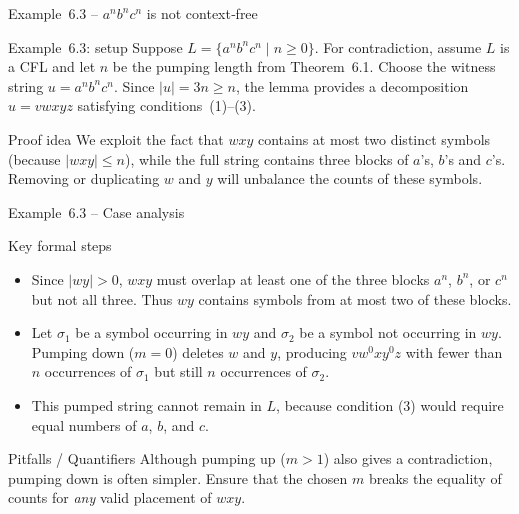 \begin{frame}[t]{Example 6.3 – $a^n b^n c^n$ is not context‑free}
  \begin{texample}{Example 6.3: setup}
    Suppose $L = \{ a^n b^n c^n \mid n \ge 0 \}$.  For contradiction,
    assume $L$ is a CFL and let $n$ be the pumping length from
    Theorem 6.1.  Choose the witness string $u = a^n b^n c^n$.  Since
    $|u| = 3n \ge n$, the lemma provides a decomposition $u = v w x y z$
    satisfying conditions (1)–(3).
  \end{texample}
  \begin{tblock}{Proof idea}
    We exploit the fact that $w x y$ contains at most two distinct
    symbols (because $|w x y| \le n$), while the full string contains
    three blocks of $a$’s, $b$’s and $c$’s.  Removing or duplicating
    $w$ and $y$ will unbalance the counts of these symbols.
  \end{tblock}
  \label{fr:6.1-11}
\end{frame}

\begin{frame}[t]{Example 6.3 – Case analysis}
  \begin{tblock}{Key formal steps}
    \begin{itemize}
      \item Since $|w y|>0$, $w x y$ must overlap at least one of the
        three blocks $a^n$, $b^n$, or $c^n$ but not all three.  Thus
        $w y$ contains symbols from at most two of these blocks.
      \item Let $\sigma_1$ be a symbol occurring in $w y$ and
        $\sigma_2$ be a symbol not occurring in $w y$.  Pumping down
        ($m=0$) deletes $w$ and $y$, producing $v w^0 x y^0 z$ with
        fewer than $n$ occurrences of $\sigma_1$ but still $n$
        occurrences of $\sigma_2$.
      \item This pumped string cannot remain in $L$, because condition
        (3) would require equal numbers of $a$, $b$, and $c$.
    \end{itemize}
  \end{tblock}
  \begin{talert}{Pitfalls / Quantifiers}
    Although pumping up ($m>1$) also gives a contradiction, pumping
    down is often simpler.  Ensure that the chosen $m$ breaks the
    equality of counts for \emph{any} valid placement of $w x y$.
  \end{talert}
  \label{fr:6.1-12}
\end{frame}

